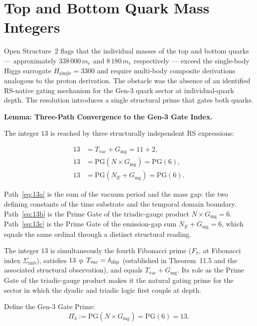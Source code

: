 \documentclass[11pt, letterpaper]{article}
\newcommand{\koppa}{\mathbin{\text{\rm\k{o}}}}
\theoremstyle{definition}
\theoremstyle{plain}
\begin{document}
\section{Top and Bottom Quark Mass Integers}

Open Structure~2 flags that the individual masses of the top and bottom quarks —
approximately $338\,000\,m_e$ and $8\,180\,m_e$ respectively — exceed the single-body
Higgs surrogate $H_\mathrm{single} = 3300$ and require multi-body composite derivations
analogous to the proton derivation. The obstacle was the absence of an identified
RS-native gating mechanism for the Gen-3 quark sector at individual-quark depth.
The resolution introduces a single structural prime that gates both quarks.

\begin{rsbox}
\textbf{Lemma: Three-Path Convergence to the Gen-3 Gate Index.}

The integer $13$ is reached by three structurally independent RS expressions:

\begin{align}
    13 &= T_\mathrm{vac} + G_\mathrm{mg} = 11 + 2, \label{eq:13a}\\
    13 &= \mathrm{PG}(N \times G_\mathrm{mg}) = \mathrm{PG}(6), \label{eq:13b}\\
    13 &= \mathrm{PG}(N_E + G_\mathrm{mg}) = \mathrm{PG}(6). \label{eq:13c}
\end{align}

Path~\eqref{eq:13a} is the sum of the vacuum period and the mass gap: the two defining
constants of the time substrate and the temporal domain boundary.
Path~\eqref{eq:13b} is the Prime Gate of the triadic-gauge product $N \times G_\mathrm{mg} = 6$.
Path~\eqref{eq:13c} is the Prime Gate of the emission-gap sum $N_E + G_\mathrm{mg} = 6$,
which equals the same ordinal through a distinct structural reading.

The integer $13$ is simultaneously the fourth Fibonacci prime ($F_7$, at Fibonacci index
$\Sigma_\mathrm{imb}$), satisfies $13 \;\mathbin{\koppa}\; T_\mathrm{vac} = \delta_\mathrm{slip}$
(established in Theorem~11.5 and the associated structural observation), and equals
$T_\mathrm{vac} + G_\mathrm{mg}$. Its role as the Prime Gate of the triadic-gauge product
makes it the natural gating prime for the sector in which the dyadic and triadic logic first
couple at depth.

Define the Gen-3 Gate Prime:
\begin{equation}
    \Pi_3 := \mathrm{PG}(N \times G_\mathrm{mg}) = \mathrm{PG}(6) = 13.
\end{equation}
\end{rsbox}
\end{document}
